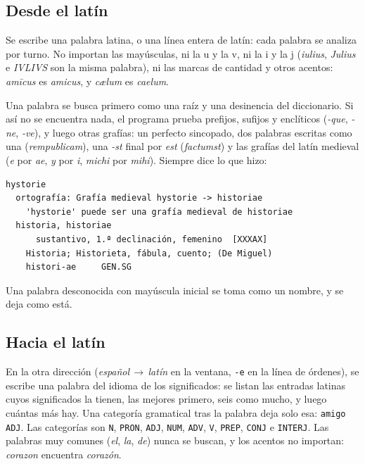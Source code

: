 \documentclass[12pt,
              article,
              oneside
              ]{memoir}
\newcommand*{\menu}[1]{\textit{#1}}
\begin{document}
\subsection{Desde el latín}

%
Se escribe una palabra latina, o una línea entera de latín: cada palabra
se analiza por turno. No importan las mayúsculas, ni la u y la v, ni la i
y la j (\textit{iulius}, \textit{Julius} e \textit{IVLIVS} son la misma
palabra), ni las marcas de cantidad y otros acentos: \textit{amīcus} es
\textit{amicus}, y \textit{cælum} es \textit{caelum}.

%
Una palabra se busca primero como una raíz y una desinencia del
diccionario. Si así no se encuentra nada, el programa prueba prefijos,
sufijos y enclíticos (\textit{-que}, \textit{-ne}, \textit{-ve}), y luego
otras grafías: un perfecto sincopado, dos palabras escritas como una
(\textit{rempublicam}), una \textit{-st} final por \textit{est}
(\textit{factumst}) y las grafías del latín medieval (\textit{e} por
\textit{ae}, \textit{y} por \textit{i}, \textit{michi} por
\textit{mihi}). Siempre dice lo que hizo:

\begin{verbatim}
hystorie
  ortografía: Grafía medieval hystorie -> historiae
    'hystorie' puede ser una grafía medieval de historiae
  historia, historiae
      sustantivo, 1.ª declinación, femenino  [XXXAX]
    Historia; Historieta, fábula, cuento; (De Miguel)
    histori-ae     GEN.SG
\end{verbatim}

\noindent{}%
Una palabra desconocida con mayúscula inicial se toma como un nombre, y se
deja como está.

\subsection{Hacia el latín}

%
En la otra dirección (\menu{español\,$\rightarrow$\,latín} en la ventana,
\texttt{-e} en la línea de órdenes), se escribe una palabra del idioma de
los significados: se listan las entradas latinas cuyos significados la
tienen, las mejores primero, seis como mucho, y luego cuántas más hay. Una
categoría gramatical tras la palabra deja solo esa: \texttt{amigo ADJ}.
Las categorías son \texttt{N}, \texttt{PRON}, \texttt{ADJ}, \texttt{NUM},
\texttt{ADV}, \texttt{V}, \texttt{PREP}, \texttt{CONJ} e \texttt{INTERJ}.
Las palabras muy comunes (\textit{el}, \textit{la}, \textit{de}) nunca se
buscan, y los acentos no importan: \textit{corazon} encuentra
\textit{corazón}.
\end{document}
